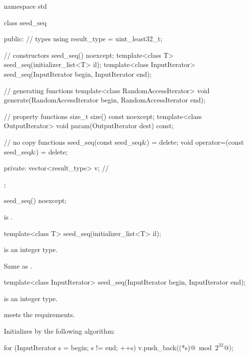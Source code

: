 %
%
\begin{codeblock}
namespace std {
  class seed_seq {
  public:
    // types
    using result_type = uint_least32_t;

    // constructors
    seed_seq() noexcept;
    template<class T>
      seed_seq(initializer_list<T> il);
    template<class InputIterator>
      seed_seq(InputIterator begin, InputIterator end);

    // generating functions
    template<class RandomAccessIterator>
      void generate(RandomAccessIterator begin, RandomAccessIterator end);

    // property functions
    size_t size() const noexcept;
    template<class OutputIterator>
      void param(OutputIterator dest) const;

    // no copy functions
    seed_seq(const seed_seq&) = delete;
    void operator=(const seed_seq&) = delete;

  private:
    vector<result_type> v;      // \expos
  };
}
\end{codeblock}


%
\begin{itemdecl}
seed_seq() noexcept;
\end{itemdecl}

\begin{itemdescr}
\pnum
\ensures
{} is .
\end{itemdescr}


%
\begin{itemdecl}
template<class T>
  seed_seq(initializer_list<T> il);
\end{itemdecl}

\begin{itemdescr}
\pnum
\constraints
{} is an integer type.

\pnum
\effects
 Same as .
\end{itemdescr}


%
\begin{itemdecl}
template<class InputIterator>
  seed_seq(InputIterator begin, InputIterator end);
\end{itemdecl}

\begin{itemdescr}
\pnum
\mandates
  is an integer type.

\pnum
\expects
   meets the
   requirements.

\pnum
\effects
Initializes 
by the following algorithm:
\begin{codeblock}
for (InputIterator s = begin; s != end; ++s)
 v.push_back((*s)@$\bmod 2^{32}$@);
\end{codeblock}%
\end{itemdescr}

